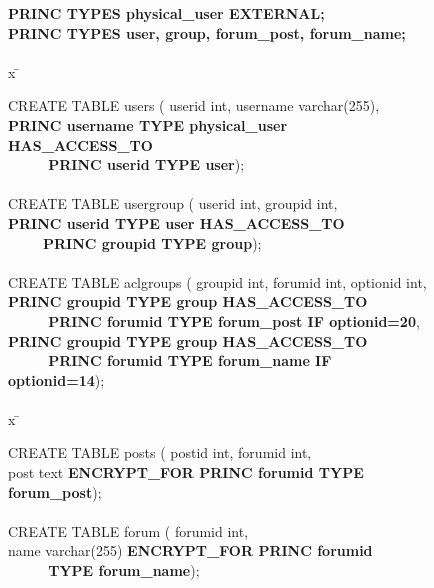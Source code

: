 \renewcommand{\FrameSep}{0.05in}
\begin{figure}[t!]
\begin{framed}
\footnotesize

\begin{tabbing}

{\bf PRINC TYPES physical\_user EXTERNAL;} \\
{\bf PRINC TYPES user, group, forum\_post, forum\_name;}\\

\\

x \= \kill

CREATE TABLE users ( userid int, username varchar(255),\\

\> {\bf PRINC username TYPE physical\_user HAS\_ACCESS\_TO } \\
\> {\bf ~ ~ ~ PRINC userid TYPE user});\\

\\

CREATE TABLE usergroup ( userid int, groupid int,\\

\> {\bf PRINC userid TYPE user HAS\_ACCESS\_TO } \\
\> {~ ~ ~ \bf PRINC groupid TYPE group});\\

\\

CREATE TABLE aclgroups ( groupid int, forumid int, optionid int, \\

\> {\bf PRINC groupid TYPE group HAS\_ACCESS\_TO }\\
\> {\bf ~ ~ ~ PRINC forumid TYPE forum\_post IF optionid=20}, \\
\> {\bf PRINC groupid TYPE group HAS\_ACCESS\_TO }\\
\> {\bf ~ ~ ~ PRINC forumid TYPE forum\_name IF optionid=14}); \\

\\
x \= \kill


CREATE TABLE posts ( postid int, forumid int,\\
\> post text {\bf ENCRYPT\_FOR PRINC forumid TYPE forum\_post});\\
\\
CREATE TABLE forum ( forumid int,\\
\> name varchar(255) {\bf ENCRYPT\_FOR PRINC forumid } \\
\> {\bf ~ ~ ~ TYPE forum\_name});


\end{tabbing}
\end{framed}
\end{figure}
